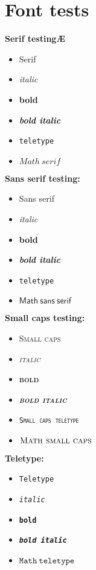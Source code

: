 \chapter{Font tests}

\noindent\textbf{Serif testingÆ}
\begin{itemize}
    \item Serif
    \item \emph{italic}
    \item \textbf{bold}
    \item \textbf{\emph{bold italic}}
    \item \texttt{teletype}
    \item $Math\ serif$
\end{itemize}


\noindent\textbf{Sans serif testing:}
\begin{itemize}
    \item \textsf{Sans serif}
    \item \textsf{\emph{italic}}
    \item \textsf{\textbf{bold}}
    \item \textsf{\textbf{\emph{bold italic}}}
    \item \textsf{\texttt{teletype}}
    \item $\mathsf{Math\ sans\ serif}$
\end{itemize}


\noindent\textbf{Small caps testing:}
\begin{itemize}
    \item \textsc{Small caps}
    \item \textsc{\emph{italic}}
    \item \textsc{\textbf{bold}}
    \item \textsc{\textbf{\emph{bold italic}}}
    \item \textsc{\texttt{Small caps teletype}}
    \item $\textsc{Math\ small\ caps}$
\end{itemize}


\textbf{Teletype:}
\begin{itemize}
    \item \texttt{Teletype}
    \item \texttt{\emph{italic}}
    \item \texttt{\textbf{bold}}
    \item \texttt{\textbf{\emph{bold italic}}}
    \item $\mathtt{Math\ teletype}$
\end{itemize}
